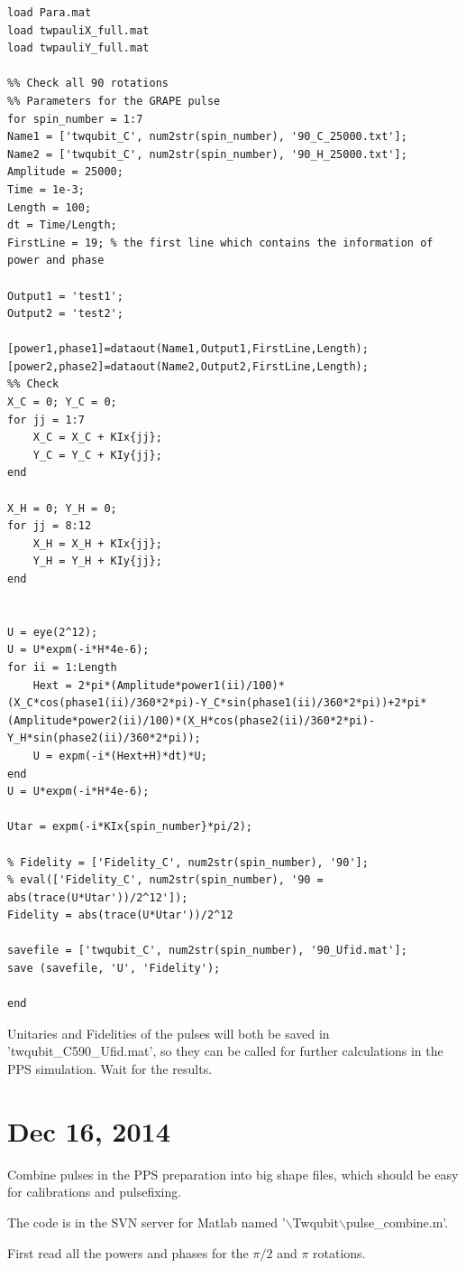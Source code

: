 \documentclass[prl,onecolumn]{revtex4-1}
\newcommand{\dir}{$\backslash$}
\begin{document}
\begin{lstlisting}
load Para.mat
load twpauliX_full.mat
load twpauliY_full.mat

%% Check all 90 rotations
%% Parameters for the GRAPE pulse
for spin_number = 1:7
Name1 = ['twqubit_C', num2str(spin_number), '90_C_25000.txt'];
Name2 = ['twqubit_C', num2str(spin_number), '90_H_25000.txt'];
Amplitude = 25000;
Time = 1e-3;
Length = 100;
dt = Time/Length;
FirstLine = 19; % the first line which contains the information of power and phase

Output1 = 'test1';
Output2 = 'test2';

[power1,phase1]=dataout(Name1,Output1,FirstLine,Length);
[power2,phase2]=dataout(Name2,Output2,FirstLine,Length);
%% Check
X_C = 0; Y_C = 0;
for jj = 1:7
    X_C = X_C + KIx{jj};
    Y_C = Y_C + KIy{jj};
end

X_H = 0; Y_H = 0;
for jj = 8:12
    X_H = X_H + KIx{jj};
    Y_H = Y_H + KIy{jj};
end


U = eye(2^12);
U = U*expm(-i*H*4e-6);
for ii = 1:Length
    Hext = 2*pi*(Amplitude*power1(ii)/100)*(X_C*cos(phase1(ii)/360*2*pi)-Y_C*sin(phase1(ii)/360*2*pi))+2*pi*(Amplitude*power2(ii)/100)*(X_H*cos(phase2(ii)/360*2*pi)-Y_H*sin(phase2(ii)/360*2*pi));
    U = expm(-i*(Hext+H)*dt)*U;
end
U = U*expm(-i*H*4e-6);

Utar = expm(-i*KIx{spin_number}*pi/2);

% Fidelity = ['Fidelity_C', num2str(spin_number), '90'];
% eval(['Fidelity_C', num2str(spin_number), '90 = abs(trace(U*Utar'))/2^12']);
Fidelity = abs(trace(U*Utar'))/2^12

savefile = ['twqubit_C', num2str(spin_number), '90_Ufid.mat'];
save (savefile, 'U', 'Fidelity');

end
\end{lstlisting}

Unitaries and Fidelities of the pulses will both be saved in 'twqubit\_C590\_Ufid.mat', so they can be called for further calculations in the PPS simulation. Wait for the results.

\newpage
\section{Dec 16, 2014}
Combine pulses in the PPS preparation into big shape files, which should be easy for calibrations and pulsefixing.

The code is in the SVN server for Matlab named '\dir Twqubit\dir pulse\_combine.m'.

First read all the powers and phases for the $\pi/2$ and $\pi$ rotations.
\end{document}
